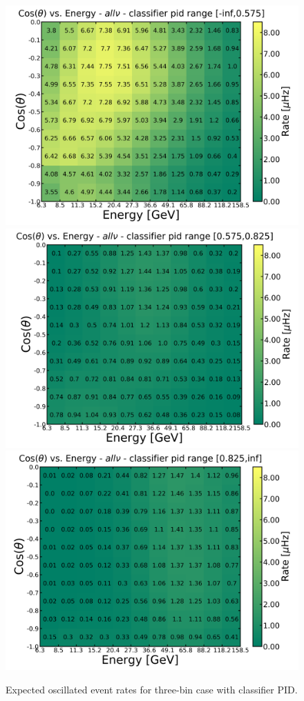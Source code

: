 \begin{appendices}
\begin{figure}[h]
    \centering
    \includegraphics[width=0.49\linewidth]{figures/three_bin_cut_0575_0825_allnu_0_oscillated_vmax.png}
    \includegraphics[width=0.49\linewidth]{figures/three_bin_cut_0575_0825_allnu_1_oscillated_vmax.png}
    \includegraphics[width=0.49\linewidth]{figures/three_bin_cut_0575_0825_allnu_2_oscillated_vmax.png}
    \caption[Expected oscillated event rates for three-bin case with classifier PID]{Expected oscillated event rates for three-bin case with classifier PID.}
    \label{fig:oscillated_histrograms_classifier_3bin}
\end{figure}



\end{appendices}
